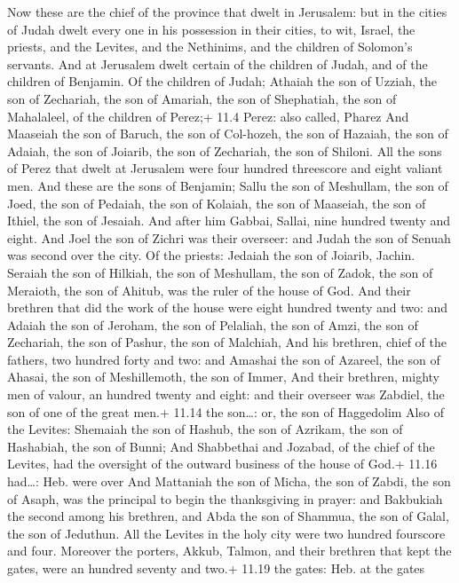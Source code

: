  Now these are the chief of the province that dwelt in
Jerusalem: but in the cities of Judah dwelt every one in his possession
in their cities, to wit, Israel, the priests, and the Levites, and the
Nethinims, and the children of Solomon's servants.  And at
Jerusalem dwelt certain of the children of Judah, and of the children of
Benjamin. Of the children of Judah; Athaiah the son of Uzziah, the son
of Zechariah, the son of Amariah, the son of Shephatiah, the son of
Mahalaleel, of the children of Perez;+ 11.4 Perez: also called, Pharez
 And Maaseiah the son of Baruch, the son of Col-hozeh, the
son of Hazaiah, the son of Adaiah, the son of Joiarib, the son of
Zechariah, the son of Shiloni.  All the sons of Perez that
dwelt at Jerusalem were four hundred threescore and eight valiant men.
 And these are the sons of Benjamin; Sallu the son of
Meshullam, the son of Joed, the son of Pedaiah, the son of Kolaiah, the
son of Maaseiah, the son of Ithiel, the son of Jesaiah.  And
after him Gabbai, Sallai, nine hundred twenty and eight. 
And Joel the son of Zichri was their overseer: and Judah the son of
Senuah was second over the city.  Of the priests: Jedaiah
the son of Joiarib, Jachin.  Seraiah the son of Hilkiah,
the son of Meshullam, the son of Zadok, the son of Meraioth, the son of
Ahitub, was the ruler of the house of God.  And their
brethren that did the work of the house were eight hundred twenty and
two: and Adaiah the son of Jeroham, the son of Pelaliah, the son of
Amzi, the son of Zechariah, the son of Pashur, the son of Malchiah,
 And his brethren, chief of the fathers, two hundred forty
and two: and Amashai the son of Azareel, the son of Ahasai, the son of
Meshillemoth, the son of Immer,  And their brethren, mighty
men of valour, an hundred twenty and eight: and their overseer was
Zabdiel, the son of one of the great men.+ 11.14 the son\ldots: or, the
son of Haggedolim  Also of the Levites: Shemaiah the son of
Hashub, the son of Azrikam, the son of Hashabiah, the son of Bunni;
 And Shabbethai and Jozabad, of the chief of the Levites,
had the oversight of the outward business of the house of God.+ 11.16
had\ldots: Heb. were over  And Mattaniah the son of Micha,
the son of Zabdi, the son of Asaph, was the principal to begin the
thanksgiving in prayer: and Bakbukiah the second among his brethren, and
Abda the son of Shammua, the son of Galal, the son of Jeduthun.
 All the Levites in the holy city were two hundred
fourscore and four.  Moreover the porters, Akkub, Talmon,
and their brethren that kept the gates, were an hundred seventy and
two.+ 11.19 the gates: Heb. at the gates

